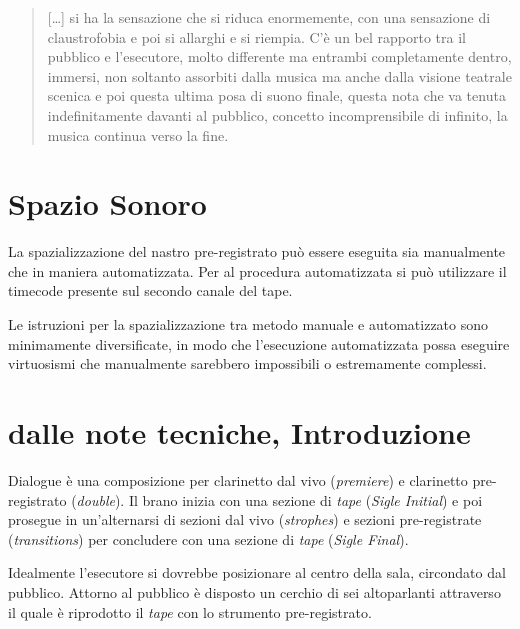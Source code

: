 


\begin{quote}
{\small
[\ldots] si ha la sensazione che si riduca enormemente, con una sensazione di claustrofobia e poi si allarghi e si riempia. C'è un bel rapporto tra il pubblico e l'esecutore, molto differente ma entrambi completamente dentro, immersi, non soltanto assorbiti dalla musica ma anche dalla visione teatrale scenica e poi questa ultima posa di suono finale, questa nota che va tenuta indefinitamente davanti al pubblico, concetto incomprensibile di infinito, la musica continua verso la fine.
}
\end{quote}

\section*{Spazio Sonoro}

La spazializzazione del nastro pre-registrato può essere eseguita sia manualmente che in maniera automatizzata. Per al procedura automatizzata si può utilizzare il timecode presente sul secondo canale del tape. 

Le istruzioni per la spazializzazione tra metodo manuale e automatizzato sono minimamente diversificate, in modo che l'esecuzione automatizzata possa eseguire virtuosismi che manualmente sarebbero impossibili o estremamente complessi.


\section{dalle note tecniche, Introduzione}

Dialogue è una composizione per clarinetto dal vivo (\emph{premiere}) e clarinetto pre-registrato (\emph{double}). Il brano inizia con una sezione di \emph{tape} (\emph{Sigle Initial}) e poi prosegue in un'alternarsi di sezioni dal vivo (\emph{strophes}) e sezioni pre-registrate (\emph{transitions}) per concludere con una sezione di \emph{tape} (\emph{Sigle Final}).

Idealmente l'esecutore si dovrebbe posizionare al centro della sala, circondato dal pubblico. Attorno al pubblico è disposto un cerchio di sei altoparlanti attraverso il quale è riprodotto il \emph{tape} con lo strumento pre-registrato.

